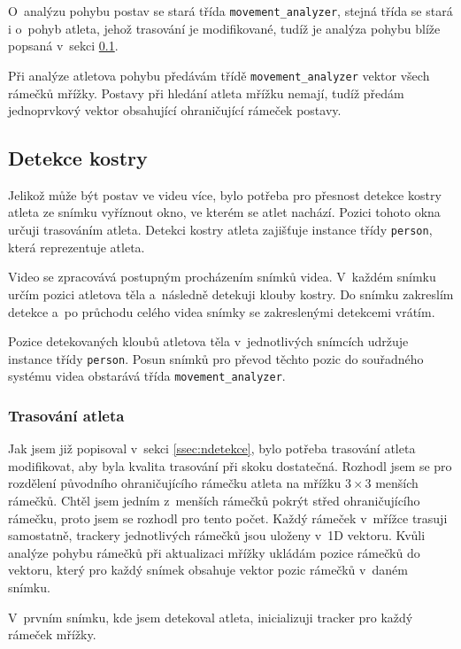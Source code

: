 O~analýzu pohybu postav se stará třída \texttt{movement\_analyzer}, stejná třída se stará i o~pohyb atleta, jehož trasování je modifikované, tudíž je analýza pohybu blíže popsaná v~sekci \ref{ssec:detekce}.

Při analýze atletova pohybu předávám třídě \texttt{movement\_analyzer} vektor všech rámečků mřížky. Postavy při hledání atleta mřížku nemají, tudíž předám jednoprvkový vektor obsahující ohraničující rámeček postavy.



\subsection{Detekce kostry}
\label{ssec:detekce}

Jelikož může být postav ve videu více, bylo potřeba pro přesnost detekce kostry atleta ze snímku vyříznout okno, ve kterém se atlet nachází. Pozici tohoto okna určuji trasováním atleta. Detekci kostry atleta zajišťuje instance třídy \texttt{person}, která reprezentuje atleta.

Video se zpracovává postupným procházením snímků videa. V~každém snímku určím pozici atletova těla a~následně detekuji klouby kostry. Do snímku zakreslím detekce a~po průchodu celého videa snímky se zakreslenými detekcemi vrátím.

Pozice detekovaných kloubů atletova těla v~jednotlivých snímcích udržuje instance třídy \texttt{person}. Posun snímků pro převod těchto pozic do souřadného systému videa obstarává třída \texttt{movement\_analyzer}.


\subsubsection{Trasování atleta}

Jak jsem již popisoval v~sekci \ref{ssec:ndetekce}, bylo potřeba trasování atleta modifikovat, aby byla kvalita trasování při skoku dostatečná. Rozhodl jsem se pro rozdělení původního ohraničujícího rámečku atleta na mřížku $3\times 3$ menších rámečků. Chtěl jsem jedním z~menších rámečků pokrýt střed ohraničujícího rámečku, proto jsem se rozhodl pro tento počet. Každý rámeček v~mřížce trasuji samostatně, trackery jednotlivých rámečků jsou uloženy v~1D vektoru. Kvůli analýze pohybu rámečků při aktualizaci mřížky ukládám pozice rámečků do vektoru, který pro každý snímek obsahuje vektor pozic rámečků v~daném snímku.

V~prvním snímku, kde jsem detekoval atleta, inicializuji tracker pro každý rámeček mřížky.

